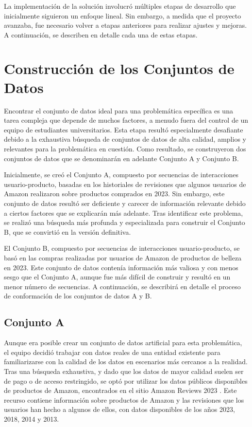 \documentclass[runningheads]{llncs}
\begin{document}
La implementación de la solución involucró múltiples etapas de desarrollo que inicialmente siguieron un enfoque lineal. Sin embargo, a medida que el proyecto avanzaba, fue necesario volver a etapas anteriores para realizar ajustes y mejoras. A continuación, se describen en detalle cada una de estas etapas.

\section{Construcción de los Conjuntos de Datos}

Encontrar el conjunto de datos ideal para una problemática específica es una tarea compleja que depende de muchos factores, a menudo fuera del control de un equipo de estudiantes universitarios. Esta etapa resultó especialmente desafiante debido a la exhaustiva búsqueda de conjuntos de datos de alta calidad, amplios y relevantes para la problemática en cuestión. Como resultado, se construyeron dos conjuntos de datos que se denominarán en adelante Conjunto A y Conjunto B.

Inicialmente, se creó el Conjunto A, compuesto por secuencias de interacciones usuario-producto, basadas en los historiales de revisiones que algunos usuarios de Amazon realizaron sobre productos comprados en 2023. Sin embargo, este conjunto de datos resultó ser deficiente y carecer de información relevante debido a ciertos factores que se explicarán más adelante. Tras identificar este problema, se realizó una búsqueda más profunda y especializada para construir el Conjunto B, que se convirtió en la versión definitiva.

El Conjunto B, compuesto por secuencias de interacciones usuario-producto, se basó en las compras realizadas por usuarios de Amazon de productos de belleza en 2023. Este conjunto de datos contenía información más valiosa y con menos sesgo que el Conjunto A, aunque fue más difícil de construir y resultó en un menor número de secuencias. A continuación, se describirá en detalle el proceso de conformación de los conjuntos de datos A y B.

\subsection{Conjunto A}

Aunque era posible crear un conjunto de datos artificial para esta problemática, el equipo decidió trabajar con datos reales de una entidad existente para familiarizarse con la calidad de los datos en escenarios más cercanos a la realidad. Tras una búsqueda exhaustiva, y dado que los datos de mayor calidad suelen ser de pago o de acceso restringido, se optó por utilizar los datos públicos disponibles de productos de Amazon, encontrados en el sitio Amazon Reviews 2023 \cite{amazon_reviews_2023}. Este recurso contiene información sobre productos de Amazon y las revisiones que los usuarios han hecho a algunos de ellos, con datos disponibles de los años 2023, 2018, 2014 y 2013.
\end{document}

